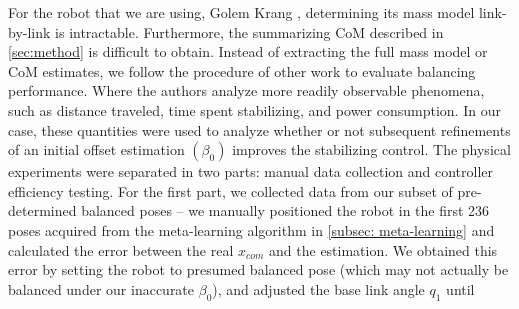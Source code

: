 \documentclass[letterpaper, 10 pt, conference]{ieeeconf}
\begin{document}
For the robot that we are using, Golem Krang \cite{Stilman2010}, determining its
mass model link-by-link is intractable.  Furthermore, the summarizing \ac{CoM}
described in \ref{sec:method} is difficult to obtain.  Instead of extracting the
full mass model or \ac{CoM} estimates, we follow the procedure of other work
\cite{bature2014comparison,khosla2013performance} to evaluate balancing
performance.  Where the authors analyze more readily observable phenomena, such
as distance traveled, time spent stabilizing, and power consumption.  In our
case, these quantities were used to analyze whether or not subsequent
refinements of an initial offset estimation $(\beta_0)$ improves the stabilizing
control.
The physical experiments were separated in two parts: manual data collection and
controller efficiency testing.
For the first part, we collected data from our subset of pre-determined balanced
poses -- we manually positioned the robot in the first 236 poses acquired from
the meta-learning algorithm in \cref{subsec: meta-learning} and calculated the
error between the real $x_{com}$ and the estimation.  We obtained this error by
setting the robot to presumed balanced pose (which may not actually be balanced
under our inaccurate $\beta_0$), and adjusted the base link angle $q_1$ until
\end{document}
